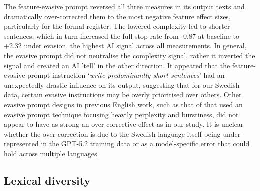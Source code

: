 \documentclass[thesis]{cluu}
\begin{document}
 
 The feature-evasive prompt reversed all three measures in its output texts and dramatically over-corrected them to the most negative feature effect sizes, particularly for the formal register. The lowered complexity led to shorter sentences, which in turn increased the full-stop rate from -0.87 at baseline to +2.32 under evasion, the highest AI signal across all measurements. In general, the evasive prompt did not neutralise the complexity signal, rather it inverted the signal and created an AI 'tell' in the other direction. It appeared that the feature-evasive prompt instruction `\textit{write predominantly short sentences}' had an unexpectedly drastic influence on its output, suggesting that for our Swedish data, certain evasive instructions may be overly prioritised over others. Other evasive prompt designs in previous English work, such as that of \textcite{lu2024sico} that used an evasive prompt technique focusing heavily perplexity and burstiness, did not appear to have as strong an over-corrective effect as in our study. It is unclear whether the over-correction is due to the Swedish language itself being under-represented in the GPT-5.2 training data or as a model-specific error that could hold across multiple languages.

\subsection{Lexical diversity} 
\end{document}
